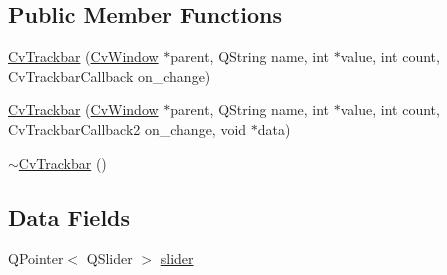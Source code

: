 \subsection*{Public Member Functions}
\begin{DoxyCompactItemize}
\item 
\hyperlink{classCvTrackbar_a5666e87ce86ec7ad97d62b89d148e9bb}{Cv\-Trackbar} (\hyperlink{classCvWindow}{Cv\-Window} $\ast$parent, Q\-String name, int $\ast$value, int count, Cv\-Trackbar\-Callback on\-\_\-change)
\item 
\hyperlink{classCvTrackbar_a36624a0a15c46a3320ce29f20eda8db8}{Cv\-Trackbar} (\hyperlink{classCvWindow}{Cv\-Window} $\ast$parent, Q\-String name, int $\ast$value, int count, Cv\-Trackbar\-Callback2 on\-\_\-change, void $\ast$data)
\item 
\hyperlink{classCvTrackbar_ae9bcf438807648149bc24d64d9294ac9}{$\sim$\-Cv\-Trackbar} ()
\end{DoxyCompactItemize}
\subsection*{Data Fields}
\begin{DoxyCompactItemize}
\item 
Q\-Pointer$<$ Q\-Slider $>$ \hyperlink{classCvTrackbar_afc7525a204cd578c21b23b842cbe28d8}{slider}
\end{DoxyCompactItemize}



